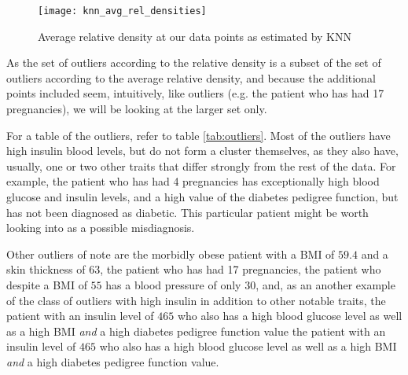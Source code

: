 \begin{figure}[htbp]
  \centering
  \texttt{[image: knn\_avg\_rel\_densities]}
  \caption{Average relative density at our data points as estimated by KNN}
  \label{fig:knn-avg-rel}
\end{figure}

As the set of outliers according to the relative density
is a subset of
the set of outliers according to the average relative density,
and because the additional points included seem, intuitively, like outliers
(e.g. the patient who has had 17 pregnancies),
we will be looking at the larger set only.

For a table of the outliers, refer to table \ref{tab:outliers}.
Most of the outliers have high insulin blood levels,
but do not form a cluster themselves,
as they also have, usually,
one or two other traits that differ strongly from the rest of the data.
For example,
the patient who has had 4 pregnancies
has exceptionally high blood glucose
and insulin levels,
and a high value of the diabetes pedigree function,
but has not been diagnosed as diabetic.
This particular patient might be worth looking into as a possible misdiagnosis.

Other outliers of note are the morbidly obese patient with a BMI of $59.4$
and a skin thickness of 63,
the patient who has had 17 pregnancies,
the patient who despite a BMI of $55$ has a blood pressure of only $30$,
and,
as an another example of the class of outliers with high insulin
in addition to other notable traits,
the patient with an insulin level of $465$
who also has a high blood glucose level as well as a high BMI
\emph{and} a high diabetes pedigree function value
the patient with an insulin level of $465$
who also has a high blood glucose level as well as a high BMI
\emph{and} a high diabetes pedigree function value.



